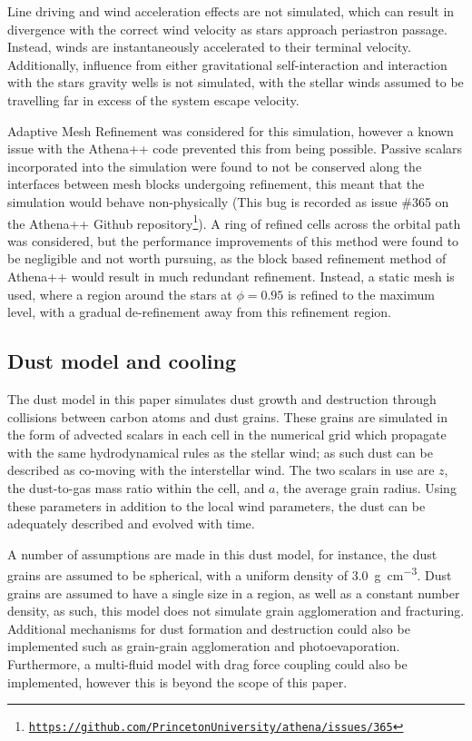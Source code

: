 \documentclass[fleqn,usenatbib]{mnras}
\begin{document}
Line driving and wind acceleration effects are not simulated, which can result in divergence with the correct wind velocity as stars approach periastron passage.
Instead, winds are instantaneously accelerated to their terminal velocity.
Additionally, influence from either gravitational self-interaction and interaction with the stars gravity wells is not simulated, with the stellar winds assumed to be travelling far in excess of the system escape velocity.

Adaptive Mesh Refinement was considered for this simulation, however a known issue with the Athena++ code prevented this from being possible.
Passive scalars incorporated into the simulation were found to not be conserved along the interfaces between mesh blocks undergoing refinement, this meant that the simulation would behave non-physically (This bug is recorded as issue \#365 on the Athena++ Github repository\footnote{\texttt{\href{https://github.com/PrincetonUniversity/athena/issues/365.}{https://github.com/PrincetonUniversity/athena/issues/365}}}).
A ring of refined cells across the orbital path was considered, but the performance improvements of this method were found to be negligible and not worth pursuing, as the block based refinement method of Athena++ would result in much redundant refinement.
Instead, a static mesh is used, where a region around the stars at $\phi = 0.95$ is refined to the maximum level, with a gradual de-refinement away from this refinement region.

\subsection{Dust model and cooling}

The dust model in this paper simulates dust growth and destruction through collisions between carbon atoms and dust grains. These grains are simulated in the form of advected scalars in each cell in the numerical grid which propagate with the same hydrodynamical rules as the stellar wind; as such dust can be described as co-moving with the interstellar wind. The two scalars in use are $z$, the dust-to-gas mass ratio within the cell, and $a$, the average grain radius. Using these parameters in addition to the local wind parameters, the dust can be adequately described and evolved with time. %

A number of assumptions are made in this dust model, for instance, the dust grains are assumed to be spherical, with a uniform density of \SI{3.0}{\gram\per\centi\metre\cubed}. Dust grains are assumed to have a single size in a region, as well as a constant number density, as such, this model does not simulate grain agglomeration and fracturing.
Additional mechanisms for dust formation and destruction could also be implemented such as grain-grain agglomeration and photoevaporation.
Furthermore, a multi-fluid model with drag force coupling could also be implemented, however this is beyond the scope of this paper.
\end{document}
